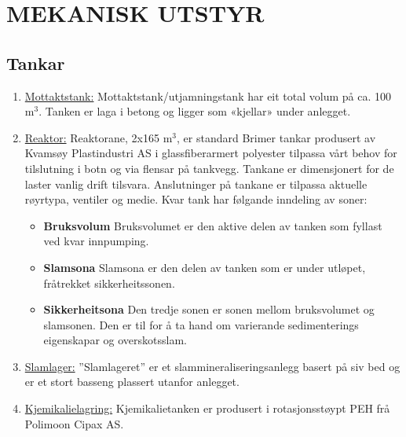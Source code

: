 \newpage
\section{MEKANISK UTSTYR}
\subsection{Tankar}

\begin{enumerate}
    \item \underline{Mottaktstank:} \newline
    Mottaktstank/utjamningstank har eit total volum på ca. 100 \(\text{m}^3\). Tanken er laga i betong og ligger som «kjellar» under anlegget.
    \item \underline{Reaktor:} \newline
    Reaktorane, 2x165 \(\text{m}^3\), er standard Brimer tankar produsert av Kvamsøy Plastindustri AS i glassfiberarmert polyester tilpassa vårt behov for tilslutning i botn og via flensar på tankvegg. 
    Tankane er dimensjonert for de laster vanlig drift tilsvara.  Anslutninger på tankane er tilpassa aktuelle røyrtypa, ventiler og medie.  
    Kvar tank har følgande inndeling av soner:
    \begin{itemize}
        \item \textbf{Bruksvolum} \newline
        Bruksvolumet er den aktive delen av tanken som fyllast ved kvar innpumping.
        \item \textbf{Slamsona} \newline
        Slamsona er den delen av tanken som er under utløpet, fråtrekket sikkerheitssonen.
        \item \textbf{Sikkerheitsona}
        Den tredje sonen er sonen mellom bruksvolumet og slamsonen. Den er til for å ta hand om varierande sedimenterings eigenskapar og overskotsslam.
    \end{itemize}
    \item \underline{Slamlager:} \newline
    ”Slamlageret” er et slammineraliseringsanlegg basert på siv bed og er et stort basseng plassert utanfor anlegget.    
    \item \underline{Kjemikalielagring:} \newline
    Kjemikalietanken er produsert i rotasjonsstøypt PEH frå Polimoon Cipax AS.
\end{enumerate}

\newpage

